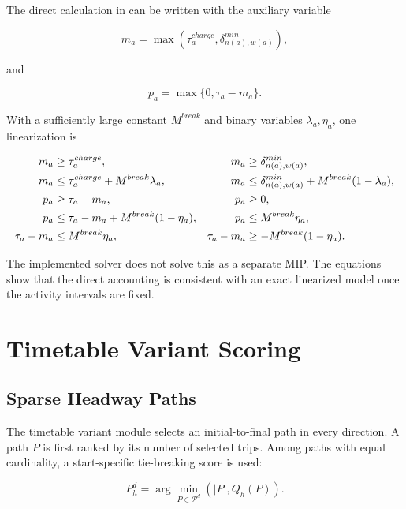 The direct calculation in  can be written with the
auxiliary variable

\begin{equation}
m_a=\max\left(\tau_a^{charge},\delta^{min}_{n(a),w(a)}\right),
\label{eq:paid-break-max}
\end{equation}

and

\begin{equation}
p_a=\max\{0,\tau_a-m_a\}.
\label{eq:paid-break-positive}
\end{equation}

With a sufficiently large constant \(M^{break}\) and binary variables
\(\lambda_a,\eta_a\), one linearization is

\begin{align}
m_a &\ge \tau_a^{charge}, &
m_a &\ge \delta^{min}_{n(a),w(a)}, \notag\\
m_a &\le \tau_a^{charge} + M^{break}\lambda_a, &
m_a &\le \delta^{min}_{n(a),w(a)} + M^{break}(1-\lambda_a), \label{eq:paid-break-linearization-a}\\
p_a &\ge \tau_a-m_a, &
p_a &\ge 0, \notag\\
p_a &\le \tau_a-m_a+M^{break}(1-\eta_a), &
p_a &\le M^{break}\eta_a, \label{eq:paid-break-linearization-b}\\
\tau_a-m_a &\le M^{break}\eta_a, &
\tau_a-m_a &\ge -M^{break}(1-\eta_a). \notag
\end{align}

The implemented solver does not solve this as a separate MIP. The equations show
that the direct accounting is consistent with an exact linearized model once the
activity intervals are fixed.

\section{Timetable Variant Scoring}

\subsection{Sparse Headway Paths}

The timetable variant module selects an initial-to-final path in every
direction. A path \(P\) is first ranked by its number of selected trips. Among
paths with equal cardinality, a start-specific tie-breaking score is used:

\begin{equation}
P_h^d
=
\arg\min_{P\in\mathcal{P}^d}
\left(|P|,Q_h(P)\right).
\label{eq:timetable-follow-selection}
\end{equation}

